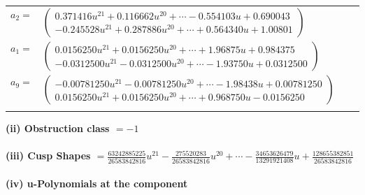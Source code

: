 \documentclass[1p]{elsarticle_modified}
\theoremstyle{definition}
\begin{document}
\begin{tabular}{m{7pt} m{180pt} m{7pt} m{180pt} }
\flushright $a_{2}=$&$\begin{pmatrix}0.371416 u^{21}+0.116662 u^{20}+\cdots-0.554103 u+0.690043\\-0.245528 u^{21}+0.287886 u^{20}+\cdots+0.564340 u+1.00801\end{pmatrix}$ \\
\flushright $a_{1}=$&$\begin{pmatrix}0.0156250 u^{21}+0.0156250 u^{20}+\cdots+1.96875 u+0.984375\\-0.0312500 u^{21}-0.0312500 u^{20}+\cdots-1.93750 u+0.0312500\end{pmatrix}$ \\
\flushright $a_{9}=$&$\begin{pmatrix}-0.00781250 u^{21}-0.00781250 u^{20}+\cdots-1.98438 u+0.00781250\\0.0156250 u^{21}+0.0156250 u^{20}+\cdots+0.968750 u-0.0156250\end{pmatrix}$\\&\end{tabular}
\flushleft \textbf{(ii) Obstruction class $= -1$}\\~\\
\flushleft \textbf{(iii) Cusp Shapes $= \frac{63242885225}{26583842816} u^{21}-\frac{275520283}{26583842816} u^{20}+\cdots-\frac{34653626479}{13291921408} u+\frac{128655382851}{26583842816}$}\\~\\
\newpage\renewcommand{\arraystretch}{1}
\flushleft \textbf{(iv) u-Polynomials at the component}\newline \\
\end{document}
